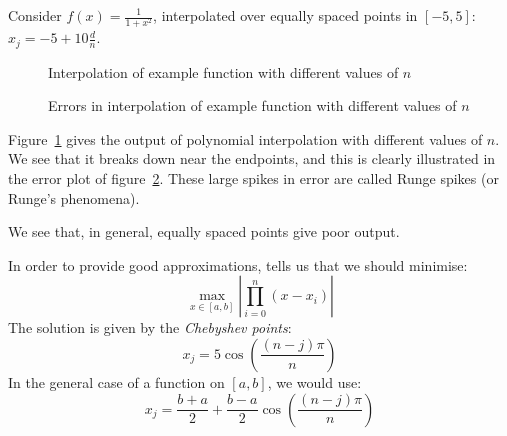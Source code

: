 \documentclass[../Main.tex]{subfiles}
\begin{document}
\begin{example}
    Consider $f(x) = \frac{1}{1 + x^2}$, interpolated over equally spaced points in $[-5, 5]$: $x_j = -5 + 10\frac{d}{n}$.

    \begin{figure}
        \centering
        \caption{Interpolation of example function with different values of $n$}
        \label{figInterpExp}
    \end{figure}
    \begin{figure}
        \centering
        \caption{Errors in interpolation of example function with different values of $n$}
        \label{figInterpExpErr}
    \end{figure}

    Figure~\ref{figInterpExp} gives the output of polynomial interpolation with different values of $n$. We see that it breaks down near the endpoints, and this is clearly illustrated in the error plot of figure~\ref{figInterpExpErr}. These large spikes in error are called Runge spikes (or Runge's phenomena).

    We see that, in general, equally spaced points give poor output.
\end{example}
In order to provide good approximations,  tells us that we should minimise:
\begin{equation*}
    \max_{x \in [a, b]} \left|\prod_{i=0}^{n} (x - x_i)\right|
\end{equation*}
The solution is given by the \textit{Chebyshev points}:
\begin{equation*}
    x_j = 5\cos\left(\frac{(n - j)\pi}{n}\right)
\end{equation*}
In the general case of a function on $[a, b]$, we would use:
\begin{equation}
    x_j = \frac{b + a}{2} + \frac{b - a}{2}\cos\left(\frac{(n - j)\pi}{n}\right)
    \label{eqnChebyshevPoints}
\end{equation}
\end{document}
